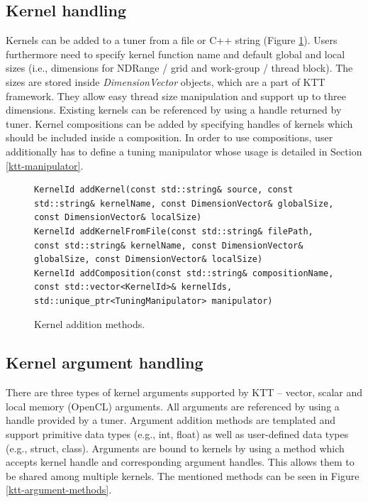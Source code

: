 \documentclass
[
    digital, %
    oneside, %
    table, %
    nolof, %
    nolot, %
    nocover %
]{fithesis3}
\begin{document}
\subsection{Kernel handling}
Kernels can be added to a tuner from a file or C++ string (Figure \ref{ktt-kernel-methods}). Users furthermore need to specify kernel function name and
default global and local sizes (i.e., dimensions for NDRange / grid and work-group / thread block). The sizes are stored inside \textit{DimensionVector}
objects, which are a part of KTT framework. They allow easy thread size manipulation and support up to three dimensions. Existing kernels can be referenced
by using a handle returned by tuner. Kernel compositions can be added by specifying handles of kernels which should be included inside a composition. In order
to use compositions, user additionally has to define a tuning manipulator whose usage is detailed in Section \ref{ktt-manipulator}.

\begin{figure}
\begin{adjustwidth}{-1cm}{-1cm}
\begin{lstlisting}
KernelId addKernel(const std::string& source, const std::string& kernelName, const DimensionVector& globalSize, const DimensionVector& localSize)
KernelId addKernelFromFile(const std::string& filePath, const std::string& kernelName, const DimensionVector& globalSize, const DimensionVector& localSize)
KernelId addComposition(const std::string& compositionName, const std::vector<KernelId>& kernelIds, std::unique_ptr<TuningManipulator> manipulator)
\end{lstlisting}
\caption{Kernel addition methods.}
\label{ktt-kernel-methods}
\end{adjustwidth}
\end{figure}

\subsection{Kernel argument handling}
There are three types of kernel arguments supported by KTT -- vector, scalar and local memory (OpenCL) arguments. All arguments are referenced by using
a handle provided by a tuner. Argument addition methods are templated and support primitive data types (e.g., int, float) as well as user-defined data
types (e.g., struct, class). Arguments are bound to kernels by using a method which accepts kernel handle and corresponding argument handles. This allows
them to be shared among multiple kernels. The mentioned methods can be seen in Figure \ref{ktt-argument-methods}.
\end{document}
